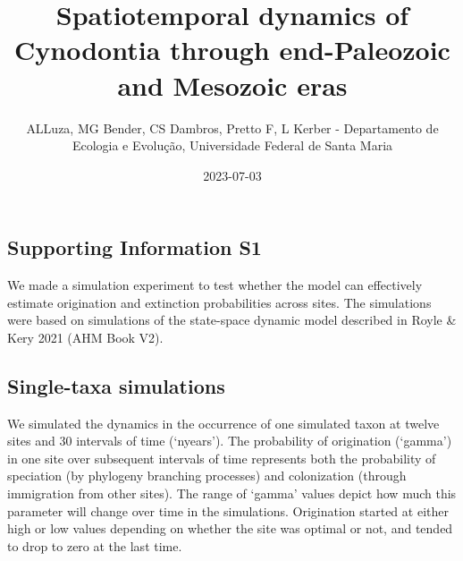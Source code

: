 \documentclass[
]{article}
\title{Spatiotemporal dynamics of Cynodontia through end-Paleozoic and
Mesozoic eras}
\author{ALLuza, MG Bender, CS Dambros, Pretto F, L Kerber - Departamento
de Ecologia e Evolução, Universidade Federal de Santa Maria}
\date{2023-07-03}
\begin{document}
\maketitle

\hypertarget{supporting-information-s1}{%
\subsection{Supporting Information S1}\label{supporting-information-s1}}

We made a simulation experiment to test whether the model can
effectively estimate origination and extinction probabilities across
sites. The simulations were based on simulations of the state-space
dynamic model described in Royle \& Kery 2021 (AHM Book V2).

\hypertarget{single-taxa-simulations}{%
\subsection{Single-taxa simulations}\label{single-taxa-simulations}}

We simulated the dynamics in the occurrence of one simulated taxon at
twelve sites and 30 intervals of time (`nyears'). The probability of
origination (`gamma') in one site over subsequent intervals of time
represents both the probability of speciation (by phylogeny branching
processes) and colonization (through immigration from other sites). The
range of `gamma' values depict how much this parameter will change over
time in the simulations. Origination started at either high or low
values depending on whether the site was optimal or not, and tended to
drop to zero at the last time.
\end{document}
